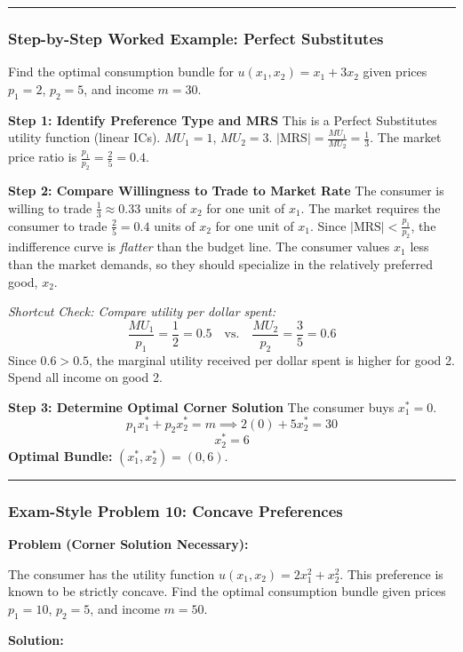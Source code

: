 \documentclass{article}
\begin{document}
\noindent\rule{\linewidth}{0.4pt}

\subsubsection*{Step-by-Step Worked Example: Perfect Substitutes}

Find the optimal consumption bundle for $u(x_1, x_2) = x_1 + 3x_2$ given prices $p_1=2$, $p_2=5$, and income $m=30$.

\textbf{Step 1: Identify Preference Type and MRS} This is a Perfect Substitutes utility function (linear ICs). $MU_1 = 1$, $MU_2 = 3$. $|\text{MRS}| = \frac{MU_1}{MU_2} = \frac{1}{3}$. The market price ratio is $\frac{p_1}{p_2} = \frac{2}{5} = 0.4$.

\textbf{Step 2: Compare Willingness to Trade to Market Rate} The consumer is willing to trade $\frac{1}{3} \approx 0.33$ units of $x_2$ for one unit of $x_1$. The market requires the consumer to trade $\frac{2}{5} = 0.4$ units of $x_2$ for one unit of $x_1$. Since $|\text{MRS}| < \frac{p_1}{p_2}$, the indifference curve is \textit{flatter} than the budget line. The consumer values $x_1$ less than the market demands, so they should specialize in the relatively preferred good, $x_2$.

\textit{Shortcut Check: Compare utility per dollar spent:}
\[ \frac{MU_1}{p_1} = \frac{1}{2} = 0.5 \quad \text{vs.} \quad \frac{MU_2}{p_2} = \frac{3}{5} = 0.6 \]
Since $0.6 > 0.5$, the marginal utility received per dollar spent is higher for good 2. Spend all income on good 2.

\textbf{Step 3: Determine Optimal Corner Solution} The consumer buys $x_1^*=0$.
\[ p_1 x_1^* + p_2 x_2^* = m \implies 2(0) + 5x_2^* = 30 \]
\[ x_2^* = 6 \]
\textbf{Optimal Bundle:} $(x_1^*, x_2^*) = (0, 6)$.

\noindent\rule{\linewidth}{0.4pt}

\subsubsection*{Exam-Style Problem 10: Concave Preferences}

\textbf{Problem (Corner Solution Necessary):}

The consumer has the utility function $u(x_1, x_2) = 2x_1^2 + x_2^2$. This preference is known to be strictly concave. Find the optimal consumption bundle given prices $p_1=10$, $p_2=5$, and income $m=50$.

\textbf{Solution:}
\end{document}
